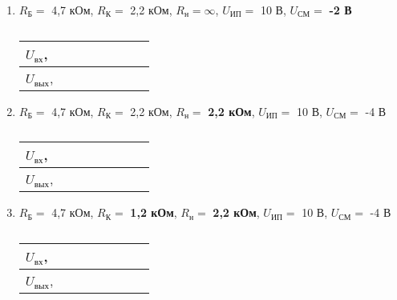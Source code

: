 \begin{enumerate}
\begin{enumerate}
\item 
$ R_{\text{Б}} = $ 4,7 кОм, $ R_{\text{К}} = $ 2,2 кОм, $ R_{\text{н}} = \infty $, $ U_{\text{ИП}} = $ 10 В, $ U_{\text{СМ}} = $ \textbf{-2 В}    

\begin{table} [h!]
  \caption{}
  \begin{tabular}{| m{2cm} | m{1.5cm} | m{1.5cm} | m{1.5cm} | m{1.5cm} | m{1.5cm} | m{1.5cm} | m{1.5cm} |}
    \hline
    \centering $ U_{\text{вх}} $, \hspace{1cm}  & & & & & & & \\
    \hline
    \centering $ U_{\text{вых}} $, \hspace{1cm} & & & & & & & \\
    \hline
  \end{tabular}
\end{table}

\item 
$ R_{\text{Б}} = $ 4,7 кОм, $ R_{\text{К}} = $ 2,2 кОм, $ R_{\text{н}} = $ \textbf{2,2 кОм}, $ U_{\text{ИП}} = $ 10 В, $ U_{\text{СМ}} = $ -4 В    

\begin{table} [h!]
  \caption{}
  \begin{tabular}{| m{2cm} | m{1.5cm} | m{1.5cm} | m{1.5cm} | m{1.5cm} | m{1.5cm} | m{1.5cm} | m{1.5cm} |}
    \hline
    \centering $ U_{\text{вх}} $, \hspace{1cm}  & & & & & & & \\
    \hline
    \centering $ U_{\text{вых}} $, \hspace{1cm} & & & & & & & \\
    \hline
  \end{tabular}
\end{table}

\item 
$ R_{\text{Б}} = $ 4,7 кОм, $ R_{\text{К}} = $ \textbf{1,2 кОм}, $ R_{\text{н}} = $ \textbf{2,2 кОм}, $ U_{\text{ИП}} = $ 10 В, $ U_{\text{СМ}} = $ -4 В    

\begin{table} [h!]
  \caption{}
  \begin{tabular}{| m{2cm} | m{1.5cm} | m{1.5cm} | m{1.5cm} | m{1.5cm} | m{1.5cm} | m{1.5cm} | m{1.5cm} |}
    \hline
    \centering $ U_{\text{вх}} $, \hspace{1cm}  & & & & & & & \\
    \hline
    \centering $ U_{\text{вых}} $, \hspace{1cm} & & & & & & & \\
    \hline
  \end{tabular}
\end{table}


\end{enumerate}
\end{enumerate}
